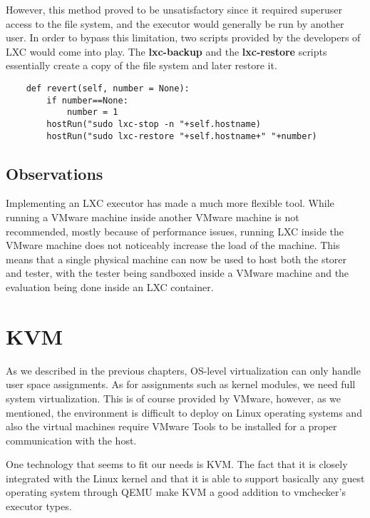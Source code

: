 However, this method proved to be unsatisfactory since it required superuser access to
the file system, and the executor would generally be run by another user. 
In order to bypass this limitation,
two scripts provided by the developers of LXC would come into play. 
The \textbf{lxc-backup} and the \textbf{lxc-restore} scripts essentially create a
copy of the file system and later restore it.

\lstset{caption=Restoring the Container to a Previous State, language=python, label=lst:lxc-revert}
\begin{lstlisting}
    def revert(self, number = None):
        if number==None:
            number = 1
        hostRun("sudo lxc-stop -n "+self.hostname)
        hostRun("sudo lxc-restore "+self.hostname+" "+number)
\end{lstlisting}

\subsection{Observations}
\label{sec:vmc-lxc-comments}

Implementing an LXC executor has made \project a much more flexible tool.
While running a VMware machine inside another VMware machine is not recommended,
mostly because of performance issues, running LXC inside the VMware machine
does not noticeably increase the load of the machine. This means that a single
physical machine can now be used to host both the storer and tester, with the
tester being sandboxed inside a VMware machine and the evaluation being done
inside an LXC container.

\section{KVM}
\label{sec:vmc-kvm}

As we described in the previous chapters, OS-level virtualization can only
handle user space assignments. As for assignments such as kernel modules,
we need full system virtualization. This is of course provided by VMware,
however, as we mentioned, the environment is difficult to deploy on 
Linux operating systems and also the virtual machines require VMware Tools
to be installed for a proper communication with the host.

One technology that seems to fit our needs is KVM. The fact that it is closely
integrated with the Linux kernel and that it is able to support basically
any guest operating system through QEMU make KVM a good addition to vmchecker's 
executor types.

